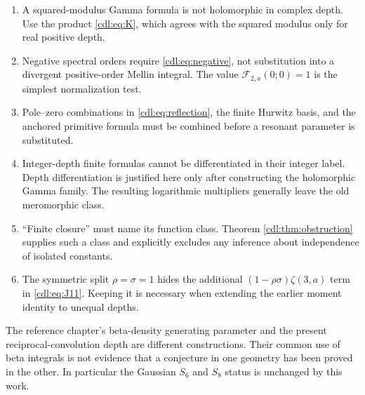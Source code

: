 \documentclass[11pt,letterpaper]{article}
\numberwithin{equation}{section}
\theoremstyle{definition}\newtheorem{definition}[theorem]{Definition}
\theoremstyle{remark}\newtheorem{remark}[theorem]{Remark}
\newcommand{\F}{\mathcal F}\newcommand{\E}{\mathcal E}
\begin{document}
\begin{enumerate}[label=(\alph*)]
\item A squared-modulus Gamma formula is not holomorphic in complex depth.
Use the product \eqref{cdl:eq:K}, which agrees with the squared modulus
only for real positive depth.
\item Negative spectral orders require \eqref{cdl:eq:negative}, not
substitution into a divergent positive-order Mellin integral.
The value $\F_{2,a}(0;0)=1$ is the simplest normalization test.
\item Pole--zero combinations in \eqref{cdl:eq:reflection}, the finite
Hurwitz basis, and the anchored primitive formula must be combined
before a resonant parameter is substituted.
\item Integer-depth finite formulas cannot be differentiated in their
integer label. Depth differentiation is justified here only after
constructing the holomorphic Gamma family. The resulting logarithmic
multipliers generally leave the old meromorphic class.
\item ``Finite closure'' must name its function class. Theorem
\ref{cdl:thm:obstruction} supplies such a class and explicitly excludes
any inference about independence of isolated constants.
\item The symmetric split $\rho=\sigma=1$ hides the additional
$(1-\rho\sigma)\zeta(3,a)$ term in \eqref{cdl:eq:J11}. Keeping it is
necessary when extending the earlier moment identity to unequal depths.
\end{enumerate}

The reference chapter's beta-density generating parameter and the present
reciprocal-convolution depth are different constructions. Their common
use of beta integrals is not evidence that a conjecture in one geometry
has been proved in the other. In particular the Gaussian $S_6$ and $S_8$
status is unchanged by this work.
\end{document}
